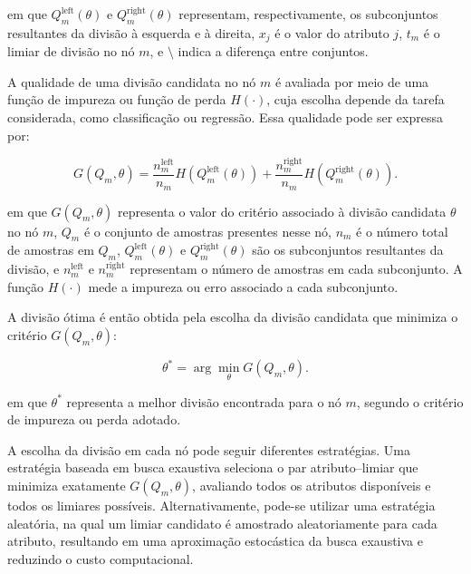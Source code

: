 \noindent em que \(Q_m^{\mathrm{left}}(\theta)\) e \(Q_m^{\mathrm{right}}(\theta)\) representam, respectivamente, os subconjuntos resultantes da divisão à esquerda e à direita, \(x_j\) é o valor do atributo \(j\), \(t_m\) é o limiar de divisão no nó \(m\), e \(\setminus\) indica a diferença entre conjuntos.

A qualidade de uma divisão candidata no nó \(m\) é avaliada por meio de uma função de impureza ou função de perda \(H(\cdot)\), cuja escolha depende da tarefa considerada, como classificação ou regressão. Essa qualidade pode ser expressa por:

\begin{equation}
G(Q_m,\theta) =
\frac{n_m^{\mathrm{left}}}{n_m} H\left(Q_m^{\mathrm{left}}(\theta)\right)
+
\frac{n_m^{\mathrm{right}}}{n_m} H\left(Q_m^{\mathrm{right}}(\theta)\right).
\label{eq:criterio_divisao_arvore}
\end{equation}

\noindent em que \(G(Q_m,\theta)\) representa o valor do critério associado à divisão candidata \(\theta\) no nó \(m\), \(Q_m\) é o conjunto de amostras presentes nesse nó, \(n_m\) é o número total de amostras em \(Q_m\), \(Q_m^{\mathrm{left}}(\theta)\) e \(Q_m^{\mathrm{right}}(\theta)\) são os subconjuntos resultantes da divisão, e \(n_m^{\mathrm{left}}\) e \(n_m^{\mathrm{right}}\) representam o número de amostras em cada subconjunto. A função \(H(\cdot)\) mede a impureza ou erro associado a cada subconjunto.

A divisão ótima é então obtida pela escolha da divisão candidata que minimiza o critério \(G(Q_m,\theta)\):

\begin{equation}
\theta^* = \arg\min_{\theta} G(Q_m,\theta).
\label{eq:divisao_otima_arvore}
\end{equation}

\noindent em que \(\theta^*\) representa a melhor divisão encontrada para o nó \(m\), segundo o critério de impureza ou perda adotado.

A escolha da divisão em cada nó pode seguir diferentes estratégias. Uma estratégia baseada em busca exaustiva seleciona o par atributo--limiar que minimiza exatamente \(G(Q_m,\theta)\), avaliando todos os atributos disponíveis e todos os limiares possíveis. Alternativamente, pode-se utilizar uma estratégia aleatória, na qual um limiar candidato é amostrado aleatoriamente para cada atributo, resultando em uma aproximação estocástica da busca exaustiva e reduzindo o custo computacional.

